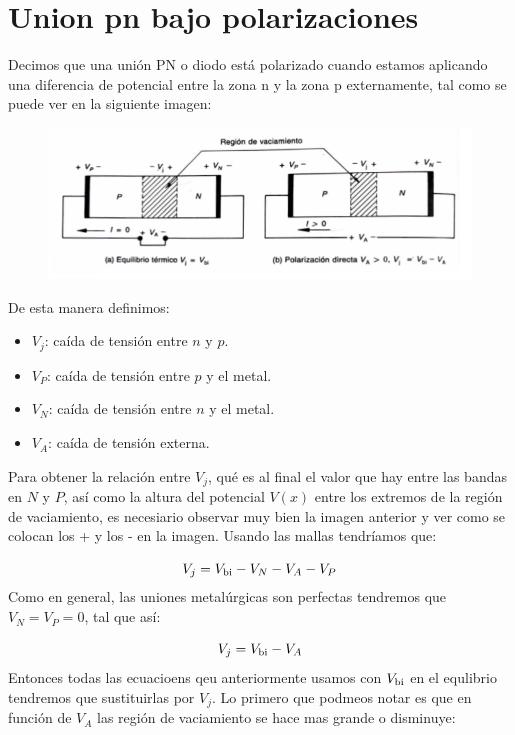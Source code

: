 \section{Union pn bajo polarizaciones} \label{Sec:03-02}

Decimos que una unión PN o diodo está polarizado cuando estamos aplicando una diferencia de potencial entre la zona n y la zona p externamente, tal como se puede ver en la siguiente imagen: 

\begin{figure}[h!] \centering
    \includegraphics[width=0.7\linewidth]{Cuerpo/Ch_03/03_Temario_05.png}
\end{figure}
De esta manera definimos:

\begin{itemize}
    \item $V_j$: caída de tensión entre $n$ y $p$.
    \item $V_P$: caída de tensión entre $p$ y el metal.
    \item $V_N$: caída de tensión entre $n$ y el metal.
    \item $V_A$: caída de tensión externa.
\end{itemize}
Para obtener la relación entre $V_j$, qué es al final el valor que hay entre las bandas en $N$ y $P$, así como la altura del potencial $V(x)$ entre los extremos de la región de vaciamiento, es necesiario observar muy bien la imagen anterior y ver como se colocan los + y los - en la imagen. Usando las mallas tendríamos que: 

\begin{equation}
    V_j = V_{\text{bi}} - V_N - V_A - V_P
\end{equation}
Como en general, las uniones metalúrgicas son perfectas tendremos que $V_N=V_P=0$, tal que así: 


\begin{equation}
    V_j = V_{\text{bi}} - V_A
\end{equation}
Entonces todas las ecuacioens qeu anteriormente usamos con $V_{\text{bi}}$ en el equlibrio tendremos que sustituirlas por $V_j$. Lo primero que podmeos notar es que en función de $V_A$ las región de vaciamiento se hace mas grande o disminuye: 


